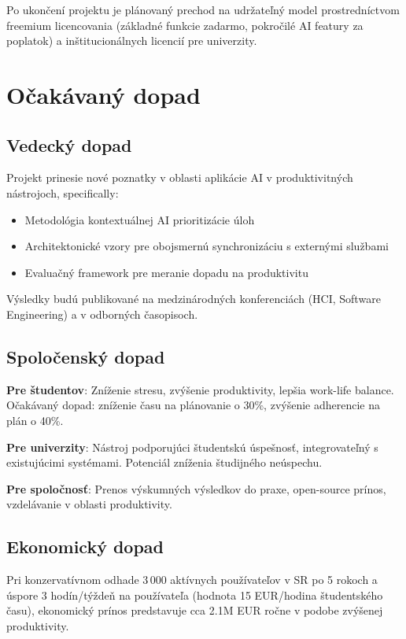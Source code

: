 \documentclass[10pt,twocolumn,twoside,slovak,a4paper]{article}
\begin{document}
Po ukončení projektu je plánovaný prechod na udržateľný model prostredníctvom freemium licencovania (základné funkcie zadarmo, pokročilé AI featury za poplatok) a inštitucionálnych licencií pre univerzity.

\section{Očakávaný dopad}

\subsection{Vedecký dopad}

Projekt prinesie nové poznatky v oblasti aplikácie AI v produktivitných nástrojoch, specifically:
\begin{itemize}
\item Metodológia kontextuálnej AI prioritizácie úloh
\item Architektonické vzory pre obojsmernú synchronizáciu s externými službami
\item Evaluačný framework pre meranie dopadu na produktivitu
\end{itemize}

Výsledky budú publikované na medzinárodných konferenciách (HCI, Software Engineering) a v odborných časopisoch.

\subsection{Spoločenský dopad}

\textbf{Pre študentov}: Zníženie stresu, zvýšenie produktivity, lepšia work-life balance. Očakávaný dopad: zníženie času na plánovanie o 30\%, zvýšenie adherencie na plán o 40\%.

\textbf{Pre univerzity}: Nástroj podporujúci študentskú úspešnosť, integrovateľný s existujúcimi systémami. Potenciál zníženia študijného neúspechu.

\textbf{Pre spoločnosť}: Prenos výskumných výsledkov do praxe, open-source prínos, vzdelávanie v oblasti produktivity.

\subsection{Ekonomický dopad}

Pri konzervatívnom odhade 3\,000 aktívnych používateľov v SR po 5 rokoch a úspore 3 hodín/týždeň na používateľa (hodnota 15 EUR/hodina študentského času), ekonomický prínos predstavuje cca 2.1M EUR ročne v podobe zvýšenej produktivity.
\end{document}
